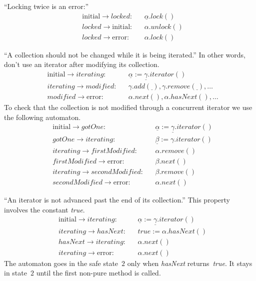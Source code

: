 \documentclass[a4paper]{article}
\newcommand{\pat}{\underline}
\theoremstyle{remark}
\begin{document}
``Locking twice is an error:''
\begin{equation}
\begin{aligned}
&\mathrm{initial}\to\mathit{locked}: &&\pat\alpha.\mathit{lock}()\\
&\mathit{locked}\to\mathrm{initial}: &&\alpha.\mathit{unlock}()\\
&\mathit{locked}\to\mathrm{error}: &&\alpha.\mathit{lock}()
\end{aligned}
\end{equation}

``A collection should not be changed while it is being iterated.''
In other words, don't use an iterator after modifying its collection.
\begin{equation}\label{eq:iter1}
\begin{aligned}
&\mathrm{initial}\to\mathit{iterating}:
  &&\pat\alpha := \pat\gamma.\mathit{iterator}()\\
&\mathit{iterating}\to\mathit{modified}:
  &&\gamma.\mathit{add}(\pat\ ),
    \gamma.\mathit{remove}(\pat\ ), \ldots \\
&\mathit{modified}\to\mathrm{error}:
  &&\alpha.\mathit{next}(), \alpha.\mathit{hasNext}(), \ldots
\end{aligned}
\end{equation}
To check that the collection is not modified through a concurrent iterator we use the following automaton.
\begin{equation}\label{eq:iter2}
\begin{aligned}
&\mathrm{initial}\to\mathit{gotOne}:
  && \pat\alpha := \pat\gamma.\mathit{iterator}() \\
&\mathit{gotOne}\to\mathit{iterating}:
  && \pat\beta := \gamma.\mathit{iterator}() \\
&\mathit{iterating}\to\mathit{firstModified}:
  &&\alpha.\mathit{remove}()\\
&\mathit{firstModified}\to\mathrm{error}:
  &&\beta.\mathit{next}()\\
&\mathit{iterating}\to\mathit{secondModified}:
  &&\beta.\mathit{remove}()\\
&\mathit{secondModified}\to\mathrm{error}:
  &&\alpha.\mathit{next}()
\end{aligned}
\end{equation}

``An iterator is not advanced past the end of its collection.''
This property involves the constant \textit{true}.
\begin{equation}\label{eq:iter3}
\begin{aligned}
&\mathrm{initial}\to\mathit{iterating}:
  && \pat\alpha := \pat\gamma.\mathit{iterator}() \\
&\mathit{iterating}\to\mathit{hasNext}:
  &&\mathit{true} := \alpha.\mathit{hasNext}() \\
&\mathit{hasNext}\to\mathit{iterating}:
  &&\alpha.\mathit{next}() \\
&\mathit{iterating}\to\mathrm{error}:
  &&\alpha.\mathit{next}()
\end{aligned}
\end{equation}
The automaton goes in the safe state~$2$ only when \textit{hasNext} returns~\textit{true}.
It stays in state~$2$ until the first non-pure method is called.
\end{document}
